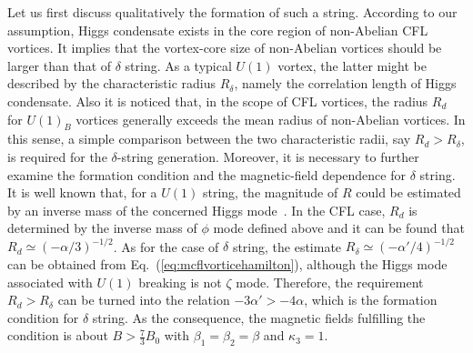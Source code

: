 \documentclass[12pt]{article}
\begin{document}
Let us first discuss qualitatively the formation of such a string. According to our assumption,
Higgs condensate exists in the core region of non-Abelian CFL vortices. It implies that the
vortex-core size of non-Abelian vortices should be larger than that of $\delta$ string. As a typical
$U(1)$ vortex, the latter might be described by the characteristic radius $R_\delta$, namely the
correlation length of Higgs condensate.
Also it is noticed that, in the scope of CFL vortices, the radius $R_d$ for $U(1)_B$ vortices generally
exceeds the mean radius of non-Abelian vortices. In this sense, a simple comparison between the two
characteristic radii, say $R_d > R_\delta$, is required for the $\delta$-string generation.
Moreover, it is necessary to further examine the formation condition and the magnetic-field dependence
for $\delta$ string. It is well known that, for a $U(1)$ string, the magnitude of $R$
could be estimated by an inverse mass of the concerned Higgs mode~\cite{vilenkin2000cosmic}.
In the CFL case, $R_d$ is determined by the inverse mass of $\phi$ mode defined above and it can be
found that $R_d \simeq (-\alpha/3)^{-1/2}$.
As for the case of $\delta$ string, the estimate $R_\delta \simeq (-\alpha'/4)^{-1/2}$ can be obtained from
Eq.~(\ref{eq:mcflvorticehamilton}), although the Higgs mode associated with $U(1)$ breaking is not $\zeta$
mode.
Therefore, the requirement $R_d > R_\delta$ can be turned into the relation $-3\alpha' > -4\alpha$,
which is the formation condition for $\delta$ string. As the consequence, the magnetic fields fulfilling
the condition is about $B > \frac{7}{3} B_0$ with $\beta_1=\beta_2=\beta$ and $\kappa_3=1$.
\end{document}
